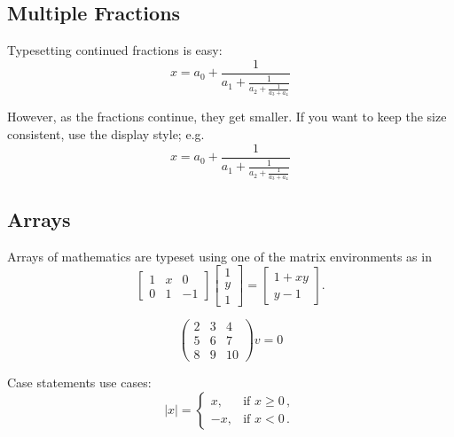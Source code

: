 \subsection{Multiple Fractions}
Typesetting continued fractions is easy:
\begin{equation}
x = a_0 + \frac{1}{a_1 + \frac{1}{a_2 + \frac{1}{a_3 + a_4}}}
\end{equation}

However, as the fractions continue, they get smaller. If you want to keep the size consistent, use the display style; e.g.
\begin{equation}
  x = a_0 + \frac{1}{\displaystyle a_1
          + \frac{1}{\displaystyle a_2
          + \frac{1}{\displaystyle a_3 + a_4}}}
\end{equation}

\subsection{Arrays}
Arrays of mathematics are typeset using one of the matrix environments as
in
\begin{equation}
        \begin{bmatrix}
                1 & x & 0 \\
                0 & 1 & -1
        \end{bmatrix}\begin{bmatrix}
                1  \\
                y  \\
                1
        \end{bmatrix}
        =\begin{bmatrix}
                1+xy  \\
                y-1
        \end{bmatrix}.
\end{equation}

\begin{equation}           
\begin{pmatrix}
2 & 3 & 4\\
5 & 6 & 7\\
8 & 9 & 10 
\end{pmatrix} v = 0 
\end{equation}

Case statements use cases:
\begin{equation}
        |x|=\begin{cases}
                x, & \text{if }x\geq 0\,,  \\
                -x, & \text{if }x< 0\,.
        \end{cases}
\end{equation}

